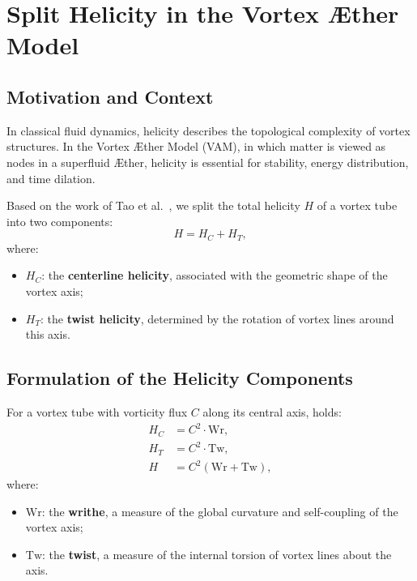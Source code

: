 \section{Split Helicity in the Vortex Æther Model}\label{sec:appendix:10}

\subsection{Motivation and Context}

In classical fluid dynamics, helicity describes the topological complexity of vortex structures. In the Vortex Æther Model (VAM), in which matter is viewed as nodes in a superfluid Æther, helicity is essential for stability, energy distribution, and time dilation.

Based on the work of Tao et al.~\cite{Tao2021}, we split the total helicity $H$ of a vortex tube into two components:
\begin{equation}
    H = H_C + H_T,
\end{equation}
where:
\begin{itemize}
    \item $H_C$: the \textbf{centerline helicity}, associated with the geometric shape of the vortex axis;
    \item $H_T$: the \textbf{twist helicity}, determined by the rotation of vortex lines around this axis.
\end{itemize}

\subsection{Formulation of the Helicity Components}

For a vortex tube with vorticity flux $C$ along its central axis, holds:
\begin{align}
    H_C &= C^2 \cdot \text{Wr}, \\
    H_T &= C^2 \cdot \text{Tw}, \\
    H &= C^2 (\text{Wr} + \text{Tw}),
\end{align}
where:
\begin{itemize}
    \item $\text{Wr}$: the \textbf{writhe}, a measure of the global curvature and self-coupling of the vortex axis;
    \item $\text{Tw}$: the \textbf{twist}, a measure of the internal torsion of vortex lines about the axis.
\end{itemize}

